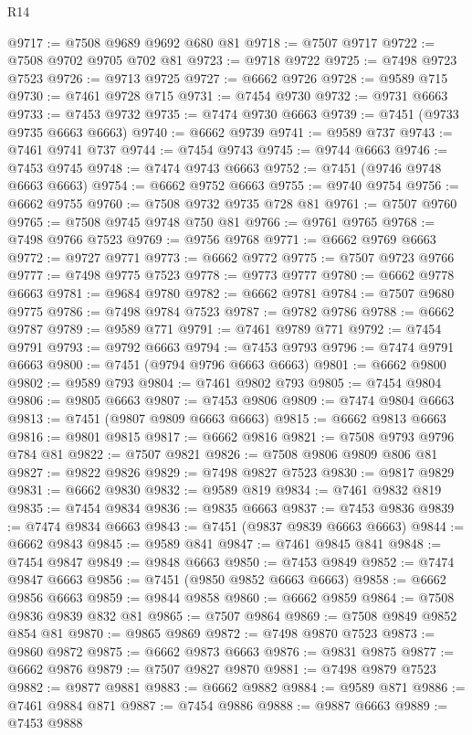 \begin{lexlean}{R14}
\begin{coremodule}
{{{{{{{{{{{{{{{{{{{{{{{{{{{{{{{{{{{{{{{{{{{{{{{{{{{{{{{{{{{{{{{{{{{{{{{{{{{{{{{{{{@9717 := @7508 @9689 @9692 @680 @81
@9718 := @7507 @9717
@9722 := @7508 @9702 @9705 @702 @81
@9723 := @9718 @9722
@9725 := @7498 @9723 @7523
@9726 := @9713 @9725
@9727 := @6662 @9726
@9728 := @9589 @715
@9730 := @7461 @9728 @715
@9731 := @7454 @9730
@9732 := @9731 @6663
@9733 := @7453 @9732
@9735 := @7474 @9730 @6663
@9739 := @7451 (@9733 @9735 @6663 @6663)
@9740 := @6662 @9739
@9741 := @9589 @737
@9743 := @7461 @9741 @737
@9744 := @7454 @9743
@9745 := @9744 @6663
@9746 := @7453 @9745
@9748 := @7474 @9743 @6663
@9752 := @7451 (@9746 @9748 @6663 @6663)
@9754 := @6662 @9752 @6663
@9755 := @9740 @9754
@9756 := @6662 @9755
@9760 := @7508 @9732 @9735 @728 @81
@9761 := @7507 @9760
@9765 := @7508 @9745 @9748 @750 @81
@9766 := @9761 @9765
@9768 := @7498 @9766 @7523
@9769 := @9756 @9768
@9771 := @6662 @9769 @6663
@9772 := @9727 @9771
@9773 := @6662 @9772
@9775 := @7507 @9723 @9766
@9777 := @7498 @9775 @7523
@9778 := @9773 @9777
@9780 := @6662 @9778 @6663
@9781 := @9684 @9780
@9782 := @6662 @9781
@9784 := @7507 @9680 @9775
@9786 := @7498 @9784 @7523
@9787 := @9782 @9786
@9788 := @6662 @9787
@9789 := @9589 @771
@9791 := @7461 @9789 @771
@9792 := @7454 @9791
@9793 := @9792 @6663
@9794 := @7453 @9793
@9796 := @7474 @9791 @6663
@9800 := @7451 (@9794 @9796 @6663 @6663)
@9801 := @6662 @9800
@9802 := @9589 @793
@9804 := @7461 @9802 @793
@9805 := @7454 @9804
@9806 := @9805 @6663
@9807 := @7453 @9806
@9809 := @7474 @9804 @6663
@9813 := @7451 (@9807 @9809 @6663 @6663)
@9815 := @6662 @9813 @6663
@9816 := @9801 @9815
@9817 := @6662 @9816
@9821 := @7508 @9793 @9796 @784 @81
@9822 := @7507 @9821
@9826 := @7508 @9806 @9809 @806 @81
@9827 := @9822 @9826
@9829 := @7498 @9827 @7523
@9830 := @9817 @9829
@9831 := @6662 @9830
@9832 := @9589 @819
@9834 := @7461 @9832 @819
@9835 := @7454 @9834
@9836 := @9835 @6663
@9837 := @7453 @9836
@9839 := @7474 @9834 @6663
@9843 := @7451 (@9837 @9839 @6663 @6663)
@9844 := @6662 @9843
@9845 := @9589 @841
@9847 := @7461 @9845 @841
@9848 := @7454 @9847
@9849 := @9848 @6663
@9850 := @7453 @9849
@9852 := @7474 @9847 @6663
@9856 := @7451 (@9850 @9852 @6663 @6663)
@9858 := @6662 @9856 @6663
@9859 := @9844 @9858
@9860 := @6662 @9859
@9864 := @7508 @9836 @9839 @832 @81
@9865 := @7507 @9864
@9869 := @7508 @9849 @9852 @854 @81
@9870 := @9865 @9869
@9872 := @7498 @9870 @7523
@9873 := @9860 @9872
@9875 := @6662 @9873 @6663
@9876 := @9831 @9875
@9877 := @6662 @9876
@9879 := @7507 @9827 @9870
@9881 := @7498 @9879 @7523
@9882 := @9877 @9881
@9883 := @6662 @9882
@9884 := @9589 @871
@9886 := @7461 @9884 @871
@9887 := @7454 @9886
@9888 := @9887 @6663
@9889 := @7453 @9888
}}}}}}}}}}}}}}}}}}}}}}}}}}}}}}}}}}}}}}}}}}}}}}}}}}}}}}}}}}}}}}}}}}}}}}}}}}}}}}}}}}
\end{coremodule}
\end{lexlean}
